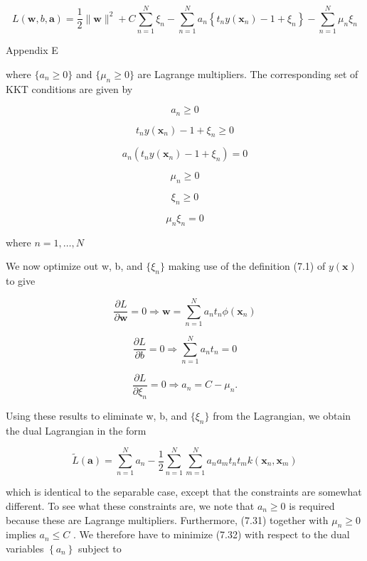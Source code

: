 \documentclass[
  10
]{article}
\begin{document}
\[
L (\mathbf {w}, b, \mathbf {a}) = \frac {1}{2} \| \mathbf {w} \| ^ {2} + C \sum_ {n = 1} ^ {N} \xi_ {n} - \sum_ {n = 1} ^ {N} a _ {n} \left\{t _ {n} y (\mathbf {x} _ {n}) - 1 + \xi_ {n} \right\} - \sum_ {n = 1} ^ {N} \mu_ {n} \xi_ {n}\tag{7.22}
\]

Appendix E

where \(\{ a _ { n } \geqslant 0 \}\) and
\(\{ \mu _ { n } \geqslant 0 \}\) are Lagrange multipliers. The
corresponding set of KKT conditions are given by

\[
a _ {n} \geqslant 0\tag{7.23}
\]

\[
t _ {n} y (\mathbf {x} _ {n}) - 1 + \xi_ {n} \geqslant 0\tag{7.24}
\]

\[
a _ {n} (t _ {n} y (\mathbf {x} _ {n}) - 1 + \xi_ {n}) = 0\tag{7.25}
\]

\[
\mu_ {n} \geqslant 0\tag{7.26}
\]

\[
\xi_ {n} \geqslant 0\tag{7.27}
\]

\[
\mu_ {n} \xi_ {n} = 0\tag{7.28}
\]

where \(n = 1 , \ldots , N\)

We now optimize out w, b, and \(\{ \xi _ { n } \}\) making use of the
definition (7.1) of \(y ( \mathbf x )\) to give

\[
\frac {\partial L}{\partial \mathbf {w}} = 0 \Rightarrow \mathbf {w} = \sum_ {n = 1} ^ {N} a _ {n} t _ {n} \phi (\mathbf {x} _ {n})\tag{7.29}
\]

\[
{\frac {\partial L}{\partial b}} = 0 \Rightarrow \sum_ {n = 1} ^ {N} a _ {n} t _ {n} = 0\tag{7.30}
\]

\[
\frac {\partial L}{\partial \xi_ {n}} = 0 \Rightarrow a _ {n} = C - \mu_ {n}.\tag{7.31}
\]

Using these results to eliminate w, b, and \(\{ \xi _ { n } \}\) from
the Lagrangian, we obtain the dual Lagrangian in the form

\[
\widetilde {L} (\mathbf {a}) = \sum_ {n = 1} ^ {N} a _ {n} - \frac {1}{2} \sum_ {n = 1} ^ {N} \sum_ {m = 1} ^ {N} a _ {n} a _ {m} t _ {n} t _ {m} k (\mathbf {x} _ {n}, \mathbf {x} _ {m})\tag{7.32}
\]

which is identical to the separable case, except that the constraints
are somewhat different. To see what these constraints are, we note that
\(a _ { n } \geqslant 0\) is required because these are Lagrange
multipliers. Furthermore, (7.31) together with
\(\mu _ { n } \geqslant 0\) implies \(a _ { n } \leqslant C\) . We
therefore have to minimize (7.32) with respect to the dual variables
\(\left\{ a _ { n } \right\}\) subject to
\end{document}
